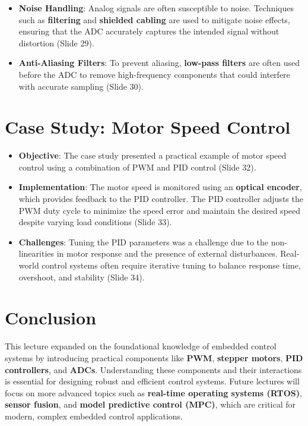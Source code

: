 \documentclass[
  14pt,
  a4paper,
  numbers=noendperiod,
  headinclude=true,
  footinclude=true,
  DIV=calc]{scrreprt}
\begin{document}
\begin{itemize}
\item
  \textbf{Noise Handling}: Analog signals are often susceptible to
  noise. Techniques such as \textbf{filtering} and \textbf{shielded
  cabling} are used to mitigate noise effects, ensuring that the ADC
  accurately captures the intended signal without distortion (Slide 29).
\item
  \textbf{Anti-Aliasing Filters}: To prevent aliasing, \textbf{low-pass
  filters} are often used before the ADC to remove high-frequency
  components that could interfere with accurate sampling (Slide 30).
\end{itemize}

\section{Case Study: Motor Speed
Control}\label{case-study-motor-speed-control}

\begin{itemize}
\item
  \textbf{Objective}: The case study presented a practical example of
  motor speed control using a combination of PWM and PID control (Slide
  32).
\item
  \textbf{Implementation}: The motor speed is monitored using an
  \textbf{optical encoder}, which provides feedback to the PID
  controller. The PID controller adjusts the PWM duty cycle to minimize
  the speed error and maintain the desired speed despite varying load
  conditions (Slide 33).
\item
  \textbf{Challenges}: Tuning the PID parameters was a challenge due to
  the non-linearities in motor response and the presence of external
  disturbances. Real-world control systems often require iterative
  tuning to balance response time, overshoot, and stability (Slide 34).
\end{itemize}

\section{Conclusion}\label{conclusion-6}

This lecture expanded on the foundational knowledge of embedded control
systems by introducing practical components like \textbf{PWM},
\textbf{stepper motors}, \textbf{PID controllers}, and \textbf{ADCs}.
Understanding these components and their interactions is essential for
designing robust and efficient control systems. Future lectures will
focus on more advanced topics such as \textbf{real-time operating
systems (RTOS)}, \textbf{sensor fusion}, and \textbf{model predictive
control (MPC)}, which are critical for modern, complex embedded control
applications.
\end{document}
